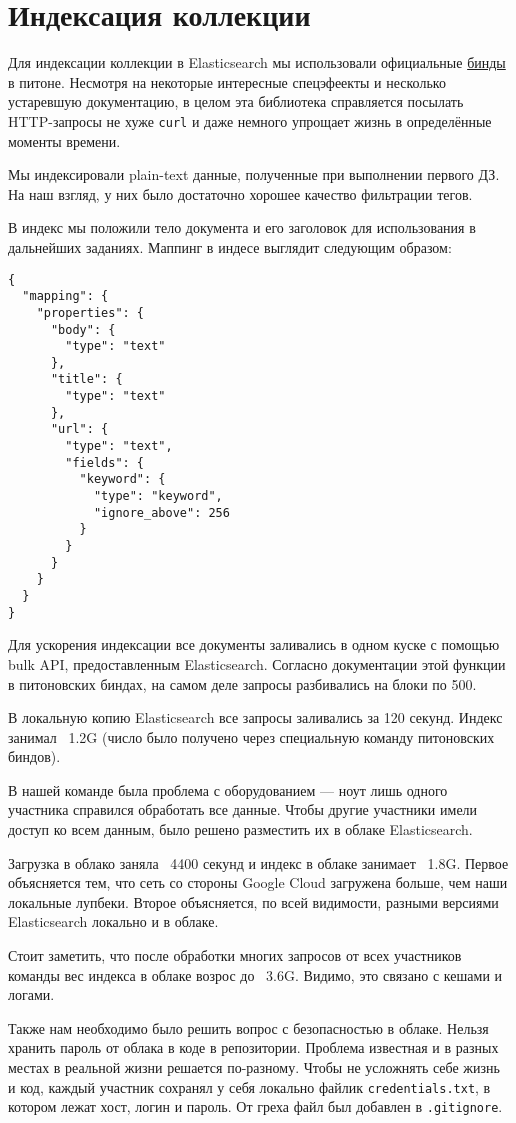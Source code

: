 \section{Индексация коллекции}

Для индексации коллекции в Elasticsearch мы использовали официальные \href{https://elasticsearch-py.readthedocs.io/en/master/api.html}{бинды} в питоне. Несмотря на некоторые интересные спецэфеекты и несколько устаревшую документацию, в целом эта библиотека справляется посылать HTTP-запросы не хуже \texttt{curl} и даже немного упрощает жизнь в определённые моменты времени.

Мы индексировали plain-text данные, полученные при выполнении первого ДЗ. На наш взгляд, у них было достаточно хорошее качество фильтрации тегов.

В индекс мы положили тело документа и его заголовок для использования в дальнейших заданиях. Маппинг в индесе выглядит следующим образом:

\begin{verbatim}
{
  "mapping": {
    "properties": {
      "body": {
        "type": "text"
      },
      "title": {
        "type": "text"
      },
      "url": {
        "type": "text",
        "fields": {
          "keyword": {
            "type": "keyword",
            "ignore_above": 256
          }
        }
      }
    }
  }
}
\end{verbatim}

Для ускорения индексации все документы заливались в одном куске с помощью bulk API, предоставленным Elasticsearch. Согласно документации этой функции в питоновских биндах, на самом деле запросы разбивались на блоки по 500.

В локальную копию Elasticsearch все запросы заливались за 120 секунд. Индекс занимал ~1.2G (число было получено через специальную команду питоновских биндов).

В нашей команде была проблема с оборудованием — ноут лишь одного участника справился обработать все данные. Чтобы другие участники имели доступ ко всем данным, было решено разместить их в облаке Elasticsearch.

Загрузка в облако заняла ~4400 секунд и индекс в облаке занимает ~1.8G.
Первое объясняется тем, что сеть со стороны Google Cloud загружена больше, чем наши локальные лупбеки. Второе объясняется, по всей видимости, разными версиями Elasticsearch локально и в облаке.

Стоит заметить, что после обработки многих запросов от всех участников команды вес индекса в облаке возрос до ~3.6G. Видимо, это связано с кешами и логами.

Также нам необходимо было решить вопрос с безопасностью в облаке. Нельзя хранить пароль от облака в коде в репозитории. Проблема известная и в разных местах в реальной жизни решается по-разному. Чтобы не усложнять себе жизнь и код, каждый участник сохранял у себя локально файлик \texttt{credentials.txt}, в котором лежат хост, логин и пароль. От греха файл был добавлен в \texttt{.gitignore}.

